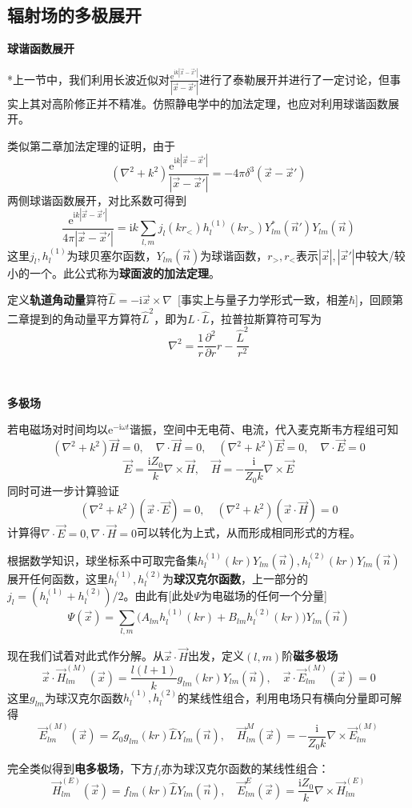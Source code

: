 \documentclass[a4paper,UTF8,fontset=windows]{ctexart}
\newcommand*{\er}{\mathrm{e}}
\newcommand*{\ir}{\mathrm{i}}
\newcommand*{\ve}{\vec{E}}
\newcommand*{\vh}{\vec{H}}
\newcommand*{\vns}{\vec{n}}
\newcommand*{\vx}{\vec{x}}
\newcommand*{\ppt}[2][t^2]{\frac{\partial^2 #2}{\partial #1}}
\begin{document}
\subsection{辐射场的多极展开}
\textbf{球谐函数展开}

*上一节中，我们利用长波近似对$\frac{\er^{\ir k|\vx-\vx'|}}{|\vx-\vx'|}$进行了泰勒展开并进行了一定讨论，但事实上其对高阶修正并不精准。仿照静电学中的加法定理，也应对利用球谐函数展开。

类似第二章加法定理的证明，由于
$$(\nabla^2+k^2)\frac{\er^{\ir k|\vx-\vx'|}}{|\vx-\vx'|}=-4\pi\delta^3(\vx-\vx')$$
两侧球谐函数展开，对比系数可得到
$$\frac{\er^{\ir k|\vx-\vx'|}}{4\pi|\vx-\vx'|}=\ir k\sum_{l,m}j_l(kr_<)h_l^{(1)}(kr_>)Y_{lm}^*(\vns')Y_{lm}(\vns)$$
这里$j_l,h_l^{(1)}$为球贝塞尔函数，$Y_{lm}(\vns)$为球谐函数，$r_>,r_<$表示$|\vx|,|\vx'|$中较大/较小的一个。此公式称为\textbf{球面波的加法定理}。

定义\textbf{轨道角动量}算符$\hat{L}=-\ir\vx\times\nabla$\ [事实上与量子力学形式一致，相差$\hbar$]，回顾第二章提到的角动量平方算符$\hat{L}^2$，即为$\hat{L}\cdot\hat{L}$，拉普拉斯算符可写为
$$\nabla^2=\frac{1}{r}\ppt[r]{}r-\frac{\hat{L}^2}{r^2}$$

\

\textbf{多极场}

若电磁场对时间均以$\er^{-\ir\omega t}$谐振，空间中无电荷、电流，代入麦克斯韦方程组可知
$$(\nabla^2+k^2)\vh=0,\quad\nabla\cdot\vh=0,\quad(\nabla^2+k^2)\ve=0,\quad\nabla\cdot\ve=0$$
$$\ve=\frac{\ir Z_0}{k}\nabla\times\vh,\quad\vh=-\frac{\ir}{Z_0k}\nabla\times\ve$$
同时可进一步计算验证
$$(\nabla^2+k^2)(\vx\cdot\ve)=0,\quad(\nabla^2+k^2)(\vx\cdot\vh)=0$$
计算得$\nabla\cdot\ve=0,\nabla\cdot\vh=0$可以转化为上式，从而形成相同形式的方程。

根据数学知识，球坐标系中可取完备集$h_l^{(1)}(kr)Y_{lm}(\vns),h_l^{(2)}(kr)Y_{lm}(\vns)$展开任何函数，这里$h_l^{(1)},h_l^{(2)}$为\textbf{球汉克尔函数}，上一部分的$j_l=(h_l^{(1)}+h_l^{(2)})/2$。由此有[此处$\Psi$为电磁场的任何一个分量]
$$\Psi(\vx)=\sum_{l,m}\big(A_{lm}h_l^{(1)}(kr)+B_{lm}h_l^{(2)}(kr)\big)Y_{lm}(\vns)$$

现在我们试着对此式作分解。从$\vx\cdot\vh$出发，定义$(l,m)$阶\textbf{磁多极场}
$$\vx\cdot\vh_{lm}^{(M)}(\vx)=\frac{l(l+1)}{k}g_{lm}(kr)Y_{lm}(\vns),\quad\vx\cdot\ve_{lm}^{(M)}(\vx)=0$$
这里$g_{lm}$为球汉克尔函数$h_l^{(1)},h_l^{(2)}$的某线性组合，利用电场只有横向分量即可解得
$$\ve_{lm}^{(M)}(\vx)=Z_0g_{lm}(kr)\hat{L}Y_{lm}(\vns),\quad\vh_{lm}^{M}(\vx)=-\frac{\ir}{Z_0k}\nabla\times\ve_{lm}^{(M)}$$

完全类似得到\textbf{电多极场}，下方$f_l$亦为球汉克尔函数的某线性组合：
$$\vh_{lm}^{(E)}(\vx)=f_{lm}(kr)\hat{L}Y_{lm}(\vns),\quad\ve_{lm}^{E}(\vx)=\frac{\ir Z_0}{k}\nabla\times\vh_{lm}^{(E)}$$
\end{document}
